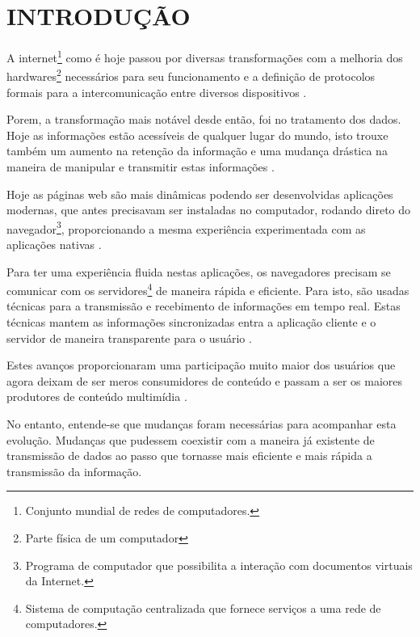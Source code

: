 \section{INTRODUÇÃO}


A internet\footnote{Conjunto mundial de redes de computadores.} como é hoje passou por diversas transformações com a melhoria dos hardwares\footnote{Parte física de um computador} necessários para seu funcionamento e a definição de protocolos formais para a intercomunicação entre diversos dispositivos \cite{Aghaei2012}.

Porem, a transformação mais notável desde então, foi no tratamento dos dados. Hoje as informações estão acessíveis de qualquer lugar do mundo, isto trouxe também um aumento na retenção da informação e uma mudança drástica na maneira de manipular e transmitir estas informações \cite{Leiner2009}.

Hoje as páginas web são mais dinâmicas podendo ser desenvolvidas aplicações modernas, que antes precisavam ser instaladas no computador, rodando direto do navegador\footnote{Programa de computador que possibilita a interação com documentos virtuais da Internet.},  proporcionando a mesma experiência experimentada com as aplicações nativas \cite{Garrett2005}.

Para ter uma experiência fluida nestas aplicações, os navegadores precisam se comunicar com os servidores\footnote{Sistema de computação centralizada que fornece serviços a uma rede de computadores.} de maneira rápida e eficiente. Para isto, são usadas técnicas para a transmissão e recebimento de informações em tempo real. Estas técnicas mantem as informações sincronizadas entra a aplicação cliente e o servidor de maneira transparente para o usuário \cite{offutt2002quality}.

Estes avanços proporcionaram uma participação muito maior dos usuários que agora deixam de ser meros consumidores de conteúdo e passam a ser os maiores produtores de conteúdo multimídia \cite{Aghaei2012}.

No entanto, entende-se que mudanças foram necessárias para acompanhar esta evolução. Mudanças que pudessem coexistir com a maneira já existente de transmissão de dados ao passo que tornasse mais eficiente e mais rápida a transmissão da informação.

